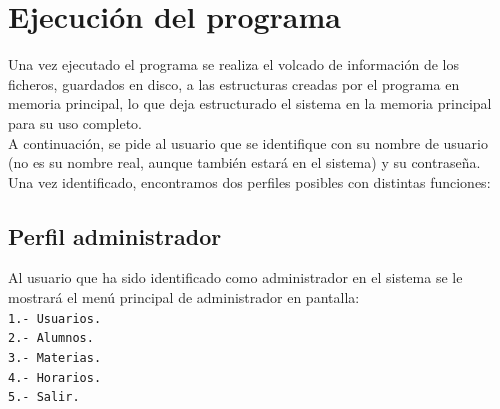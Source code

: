 \documentclass{book}
\begin{document}
\section{Ejecución del programa}
Una vez ejecutado el programa se realiza el volcado de información de los ficheros, guardados en disco, a las estructuras creadas por el programa en memoria principal, lo que deja estructurado el sistema en la memoria principal para su uso completo.\\
A continuación, se pide al usuario que se identifique con su nombre de usuario (no es su nombre real, aunque también estará en el sistema) y su contraseña.\\
Una vez identificado, encontramos dos perfiles posibles con distintas funciones:

\subsection{Perfil administrador}{
Al usuario que ha sido identificado como administrador en el sistema se le mostrará el menú principal de administrador en pantalla:\\
\texttt{1.- Usuarios.}\\
\texttt{2.- Alumnos.}\\
\texttt{3.- Materias.}\\
\texttt{4.- Horarios.}\\
\texttt{5.- Salir.}
}
\end{document}
